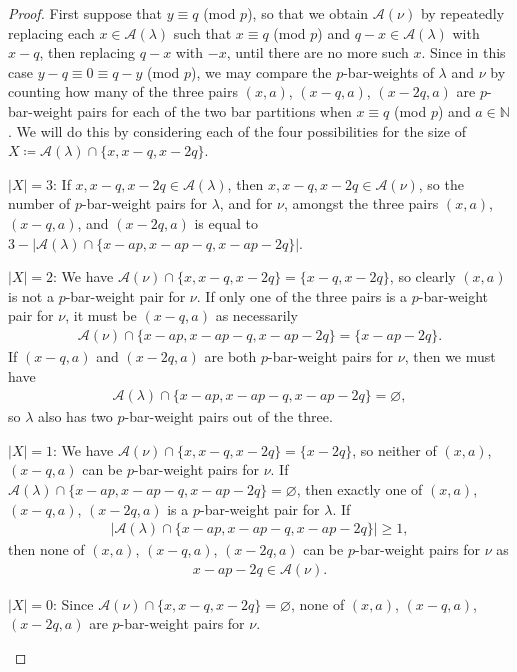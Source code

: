 \documentclass[ALCO, Unicode,published]{cedram}
\begin{document}
\begin{proof}
First suppose that $y\equiv q$ (mod $p$), so that we obtain $\mathcal{A}(\nu)$ by repeatedly replacing each $x\in\mathcal{A}(\lambda)$ such that $x\equiv q$ (mod $p$) and $q-x\in\mathcal{A}(\lambda)$ with $x-q$, then replacing $q-x$ with $-x$, until there are no more such $x$. Since in this case $y-q\equiv0\equiv q-y$ (mod $p$), we may compare the $p$-bar-weights of $\lambda$ and $\nu$ by counting how many of the three pairs $(x,a)$, $(x-q,a)$, $(x-2q,a)$ are $p$-bar-weight pairs for each of the two bar partitions when $x\equiv q$ (mod $p$) and $a\in\mathbb{N}$. We will do this by considering each of the four possibilities for the size of $X\coloneqq\mathcal{A}(\lambda)\cap\{x,x-q,x-2q\}$. 
\begin{flushleft}
$|X|=3$: If $x,x-q,x-2q\in\mathcal{A}(\lambda)$, then $x,x-q,x-2q\in\mathcal{A}(\nu)$, so the number of $p$-bar-weight pairs for $\lambda$, and for $\nu$, amongst the three pairs $(x,a)$, $(x-q,a)$, and $(x-2q,a)$ is equal to $3-|\mathcal{A}(\lambda)\cap\{x-ap,x-ap-q,x-ap-2q\}|$. 
\end{flushleft}
\begin{flushleft}
$|X|=2$: We have $\mathcal{A}(\nu)\cap\{x,x-q,x-2q\}=\{x-q,x-2q\}$, so clearly $(x,a)$ is not a $p$-bar-weight pair for $\nu$. If only one of the three pairs is a $p$-bar-weight pair for $\nu$, it must be $(x-q,a)$ as necessarily 
\begin{align*}
\mathcal{A}(\nu)\cap\{x-ap,x-ap-q,x-ap-2q\}=\{x-ap-2q\}.
\end{align*}
If $(x-q,a)$ and $(x-2q,a)$ are both $p$-bar-weight pairs for $\nu$, then we must have 
\begin{align*}
\mathcal{A}(\lambda)\cap\{x-ap,x-ap-q,x-ap-2q\}=\varnothing,\end{align*} 
so $\lambda$ also has two $p$-bar-weight pairs out of the three.
\end{flushleft}
\begin{flushleft}
$|X|=1$: We have $\mathcal{A}(\nu)\cap\{x,x-q,x-2q\}=\{x-2q\}$, so neither of $(x,a)$, $(x-q,a)$ can be $p$-bar-weight pairs for $\nu$. If $\mathcal{A}(\lambda)\cap\{x-ap,x-ap-q,x-ap-2q\}=\varnothing$, then exactly one of $(x,a)$, $(x-q,a)$, $(x-2q,a)$ is a $p$-bar-weight pair for $\lambda$. If 
\begin{align*}
|\mathcal{A}(\lambda)\cap\{x-ap,x-ap-q,x-ap-2q\}|\geq1,
\end{align*} 
then none of $(x,a)$, $(x-q,a)$, $(x-2q,a)$ can be $p$-bar-weight pairs for $\nu$ as 
\begin{align*}x-ap-2q\in\mathcal{A}(\nu). 
\end{align*}
\end{flushleft}
\begin{flushleft}
$|X|=0$: Since $\mathcal{A}(\nu)\cap\{x,x-q,x-2q\}=\varnothing$, none of $(x,a)$, $(x-q,a)$, $(x-2q,a)$ are $p$-bar-weight pairs for $\nu$. 
\end{flushleft}


\end{proof}
\end{document}

